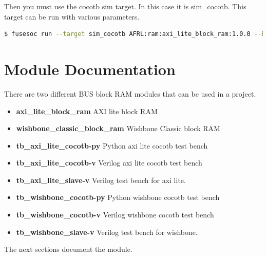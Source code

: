 Then you must use the cocotb sim target. In this case it is sim\_cocotb. This target can be run with various parameters.
\begin{lstlisting}[language=bash]
  $ fusesoc run --target sim_cocotb AFRL:ram:axi_lite_block_ram:1.0.0 --BUS_WIDTH=8
\end{lstlisting}

\newpage

\section{Module Documentation} \label{Module Documentation}

\par
There are two different BUS block RAM modules that can be used in a project.

\begin{itemize}
\item \textbf{axi\_lite\_block\_ram} AXI lite block RAM\\
\item \textbf{wishbone\_classic\_block\_ram} Wishbone Classic block RAM\\
\item \textbf{tb\_axi\_lite\_cocotb-py} Python axi lite cocotb test bench\\
\item \textbf{tb\_axi\_lite\_cocotb-v}  Verilog axi lite cocotb test bench\\
\item \textbf{tb\_axi\_lite\_slave-v} Verilog test bench for axi lite.\\
\item \textbf{tb\_wishbone\_cocotb-py} Python wishbone cocotb test bench\\
\item \textbf{tb\_wishbone\_cocotb-v}  Verilog wishbone cocotb test bench\\
\item \textbf{tb\_wishbone\_slave-v} Verilog test bench for wishbone.\\
\end{itemize}
The next sections document the module.

